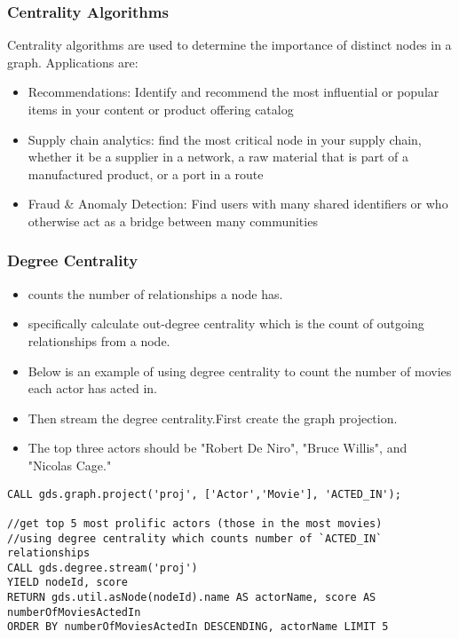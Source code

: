 \begin{frame}[fragile]\frametitle{Centrality Algorithms}

 Centrality algorithms are used to determine the importance of distinct nodes in a graph. Applications are:
 
\begin{itemize}
\item Recommendations: Identify and recommend the most influential or popular items in your content or product offering catalog
\item Supply chain analytics: find the most critical node in your supply chain, whether it be a supplier in a network, a raw material that is part of a manufactured product, or a port in a route
\item Fraud \& Anomaly Detection: Find users with many shared identifiers or who otherwise act as a bridge between many communities
\end{itemize}


\end{frame}

\begin{frame}[fragile]\frametitle{Degree Centrality}


\begin{itemize}
\item counts the number of relationships a node has.
\item specifically calculate out-degree centrality which is the count of outgoing relationships from a node.
\item Below is an example of using degree centrality to count the number of movies each actor has acted in. 
\item Then stream the degree centrality.First create the graph projection.
\item The top three actors should be "Robert De Niro", "Bruce Willis", and "Nicolas Cage."
\end{itemize}

\begin{lstlisting}
CALL gds.graph.project('proj', ['Actor','Movie'], 'ACTED_IN');

//get top 5 most prolific actors (those in the most movies)
//using degree centrality which counts number of `ACTED_IN` relationships
CALL gds.degree.stream('proj')
YIELD nodeId, score
RETURN gds.util.asNode(nodeId).name AS actorName, score AS numberOfMoviesActedIn
ORDER BY numberOfMoviesActedIn DESCENDING, actorName LIMIT 5
\end{lstlisting}

\end{frame}

